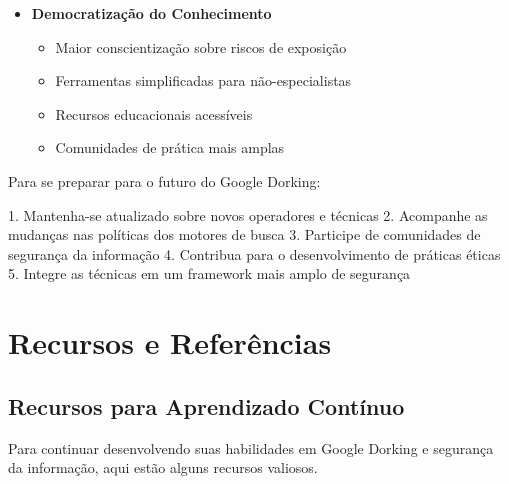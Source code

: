 \documentclass[12pt,a4paper]{book}
\begin{document}
\begin{mdframed}[backgroundcolor=roxoconhecimento!5, roundcorner=10pt, leftmargin=1cm, rightmargin=1cm]
\begin{itemize}
    \item \textbf{Democratização do Conhecimento}
    \begin{itemize}
        \item Maior conscientização sobre riscos de exposição
        \item Ferramentas simplificadas para não-especialistas
        \item Recursos educacionais acessíveis
        \item Comunidades de prática mais amplas
    \end{itemize}
\end{itemize}
\end{mdframed}

\begin{tipbox}
Para se preparar para o futuro do Google Dorking:

1. Mantenha-se atualizado sobre novos operadores e técnicas
2. Acompanhe as mudanças nas políticas dos motores de busca
3. Participe de comunidades de segurança da informação
4. Contribua para o desenvolvimento de práticas éticas
5. Integre as técnicas em um framework mais amplo de segurança
\end{tipbox}

\chapter{Recursos e Referências}

\section{Recursos para Aprendizado Contínuo}

Para continuar desenvolvendo suas habilidades em Google Dorking e segurança da informação, aqui estão alguns recursos valiosos.
\end{document}
